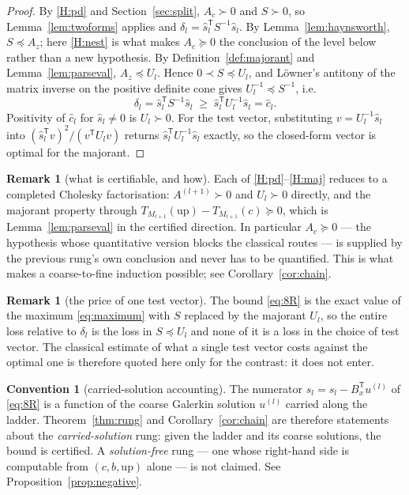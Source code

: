 \documentclass[11pt,a4paper]{article}
\theoremstyle{plain}
\theoremstyle{definition}
\newtheorem{convention}[theorem]{Convention}
\newtheorem{remark}[theorem]{Remark}
\newcommand{\T}{\mathsf{T}}
\newcommand{\Tm}[1]{T_{#1}}
\newcommand{\shat}{\widehat{s}}
\newcommand{\PSD}{\succeq 0}
\newcommand{\PD}{\succ 0}
\begin{document}
\begin{proof}
By \ref{H:pd} and Section~\ref{sec:split}, $A_{c}\PD$ and $S\PD$, so
Lemma~\ref{lem:twoforms} applies and $\delta_{l}=\shat_{l}^{\T}S^{-1}\shat_{l}$.
By Lemma~\ref{lem:haynsworth}, $S\preceq A_{z}$; here \ref{H:nest} is what makes
$A_{c}\PSD$ the conclusion of the level below rather than a new hypothesis. By
Definition~\ref{def:majorant} and Lemma~\ref{lem:parseval},
$A_{z}\preceq U_{l}$. Hence $0\prec S\preceq U_{l}$, and L\"owner's antitony of the
matrix inverse on the positive definite cone \cite{Loewner1934} gives
$U_{l}^{-1}\preceq S^{-1}$, i.e.
\[
  \delta_{l}=\shat_{l}^{\T}S^{-1}\shat_{l}
  \;\ge\;\shat_{l}^{\T}U_{l}^{-1}\shat_{l}=\widehat c_{l}.
\]
Positivity of $\widehat c_{l}$ for $\shat_{l}\neq0$ is $U_{l}\PD$. For the test
vector, substituting $v=U_{l}^{-1}\shat_{l}$ into
$(\shat_{l}^{\T}v)^{2}/(v^{\T}U_{l}v)$ returns $\shat_{l}^{\T}U_{l}^{-1}\shat_{l}$
exactly, so the closed-form vector is optimal for the majorant.
\end{proof}

\begin{remark}[what is certifiable, and how]
\label{rem:certify}
Each of \ref{H:pd}--\ref{H:maj} reduces to a completed Cholesky factorisation:
$A^{(l+1)}\PD$ and $U_{l}\PD$ directly, and the majorant property through
$\Tm{M_{l+1}}(\mathrm{up})-\Tm{M_{l+1}}(c)\PSD$, which is
Lemma~\ref{lem:parseval} in the certified direction. In particular
$A_{c}\PSD$ --- the hypothesis whose quantitative version blocks the classical
routes --- is supplied by the previous rung's own conclusion and never has to be
quantified. This is what makes a coarse-to-fine induction possible; see
Corollary~\ref{cor:chain}.
\end{remark}

\begin{remark}[the price of one test vector]
\label{rem:kantorovich}
The bound \eqref{eq:8R} is the exact value of the maximum \eqref{eq:maximum} with $S$
replaced by the majorant $U_{l}$, so the entire loss relative to $\delta_{l}$ is the
loss in $S\preceq U_{l}$ and none of it is a loss in the choice of test vector. The
classical estimate of what a single test vector costs against the optimal one
\cite{Kantorovich1948} is therefore quoted here only for the contrast: it does not
enter.
\end{remark}

\begin{convention}[carried-solution accounting]
\label{conv:carried}
The numerator $\shat_{l}=s_{l}-B_{x}^{\T}u^{(l)}$ of \eqref{eq:8R} is a
function of the coarse Galerkin solution $u^{(l)}$ carried along the ladder.
Theorem~\ref{thm:rung} and Corollary~\ref{cor:chain} are therefore statements about
the \emph{carried-solution} rung: given the ladder and its coarse solutions, the
bound is certified. A \emph{solution-free} rung --- one whose right-hand side is
computable from $(c,b,\mathrm{up})$ alone --- is not claimed. See
Proposition~\ref{prop:negative}.
\end{convention}
\end{document}
